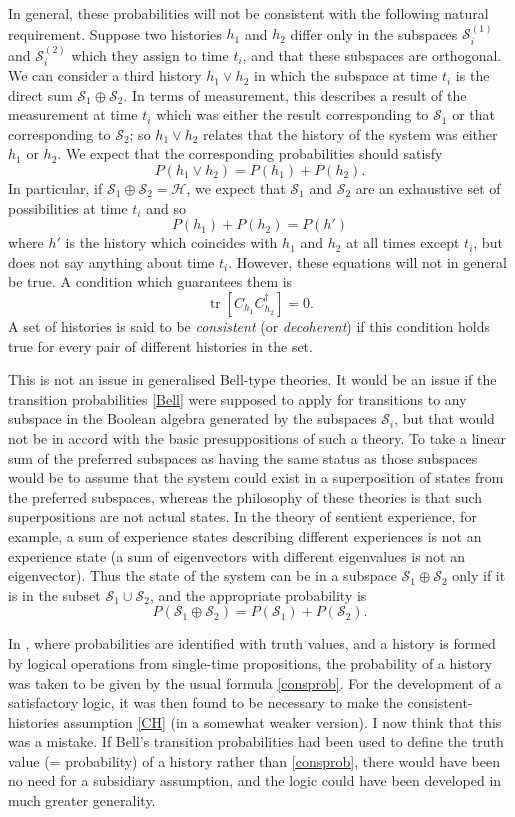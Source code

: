 \documentclass[12pt,a4paper,reqno]{article}
\newcommand{\be}{\begin{equation}}
\newcommand{\ee}{\end{equation}}
\renewcommand{\(}{\left(}
\renewcommand{\)}{\right)}
\renewcommand{\.}{\centerdot}
\renewcommand{\S}{\mathcal{S}}
\renewcommand{\H}{\mathcal{H}}
\newcommand{\1}{\mathbf{1}}
\newcommand{\<}{\langle}
\renewcommand{\>}{\rangle}
\newcommand{\tr}{\operatorname{tr}}
\theoremstyle{definition}
\theoremstyle{remark}
\numberwithin{equation}{section}
\begin{document}
In general, these probabilities will not be consistent with the following natural requirement. Suppose two histories $h_1$ and $h_2$ differ only in the subspaces $\S^{(1)}_i$ and $\S^{(2)}_i$ which they assign to time $t_i$, and that these subspaces are orthogonal. We can consider a third history $h_1\lor h_2$ in which the subspace at time $t_i$ is the direct sum $\S_1\oplus\S_2$. In terms of measurement, this describes a result of the measurement at time $t_i$ which was either the result corresponding to $\S_1$ or that corresponding to $\S_2$; so $h_1\lor h_2$ relates that the history of the system was either $h_1$ or $h_2$. We expect that the corresponding probabilities should satisfy
\[
P(h_1\lor h_2) = P(h_1) + P(h_2).
\]
In particular, if $\S_1\oplus\S_2 = \H$, we expect that $\S_1$ and $\S_2$ are an exhaustive set of possibilities at time $t_i$ and so
\[
P(h_1) + P(h_2) = P(h')
\]
where $h'$ is the history which coincides with $h_1$ and $h_2$ at all times except $t_i$, but does not say anything about time $t_i$.
However, these equations will not in general be true. A condition which guarantees them is
\be\label{CH}
\tr[C_{h_1} C_{h_2}^\dagger] = 0.
\ee
A set of histories is said to be \emph{consistent} (or \emph{decoherent}) if this condition holds true for every pair of different histories in the set.

This is not an issue in generalised Bell-type theories. It would be an issue if the transition probabilities \eqref{Bell} were supposed to apply for transitions to any subspace in the Boolean algebra generated by the subspaces $\S_i$, but that would not be in accord with the basic presuppositions of such a theory. To take a linear sum of the preferred subspaces as having the same status as those subspaces would be to assume that the system could exist in a superposition of states from the preferred subspaces, whereas the philosophy of these theories is that such superpositions are not actual states. In the theory of sentient experience, for example, a sum of experience states describing different experiences is not an experience state (a sum of eigenvectors with different eigenvalues is not an eigenvector). Thus the state of the system can be in a subspace $\S_1\oplus\S_2$ only if it is in the subset $\S_1\cup\S_2$, and the appropriate probability is 
\[
P(\S_1\oplus\S_2) = P(\S_1) + P(\S_2).
\]

In \cite{logicfuture}, where probabilities are identified with truth values, and a history is formed by logical operations from single-time propositions, the probability of a history was taken to be given by the usual formula \eqref{consprob}. For the development of a satisfactory logic, it was then found to be necessary to make the consistent-histories assumption \eqref{CH} (in a somewhat weaker version). I now think that this was a mistake. If Bell's transition probabilities had been used to define the truth value (= probability) of a history rather than \eqref{consprob}, there would have been no need for a subsidiary assumption, and the logic could have been developed in much greater generality.
\end{document}
